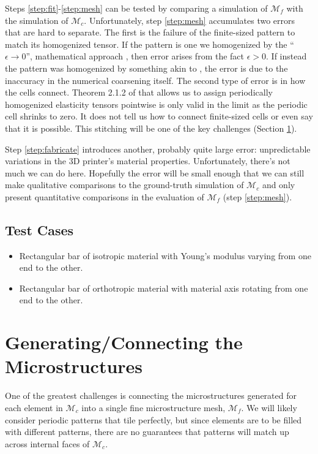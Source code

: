 \documentclass[10pt]{article}
\providecommand{\mesh}{\mathcal{M}}
\begin{document}
Steps \ref{step:fit}-\ref{step:mesh} can be tested by comparing a simulation of
$\mesh_f$ with the simulation of $\mesh_c$. Unfortunately, step \ref{step:mesh}
accumulates two errors that are hard to separate. The first is the failure of
the finite-sized pattern to match its homogenized tensor. If the pattern is one
we homogenized by the ``$\epsilon \to 0$'', mathematical approach
\cite{allaire2002shape}, then error arises from the fact $\epsilon > 0$. If
instead the pattern was homogenized by something akin to \cite{Kharevych2009},
the error is due to the inaccuracy in the numerical coarsening itself. The
second type of error is in how the cells connect. Theorem 2.1.2 of
\cite{allaire2002shape} that allows us to assign periodically homogenized
elasticity tensors pointwise is only valid in the limit as the periodic cell
shrinks to zero. It does not tell us how to connect finite-sized cells or even
say that it is possible. This stitching will be one of the key challenges
(Section \ref{sec:gen_connect}).

Step \ref{step:fabricate} introduces another, probably quite large error: unpredictable
variations in the 3D printer's material properties. Unfortunately, there's not
much we can do here. Hopefully the error will be small enough that we can still
make qualitative comparisons to the ground-truth simulation of $\mesh_c$ and
only present quantitative comparisons in the evaluation of $\mesh_f$ (step
\ref{step:mesh}).

\subsection{Test Cases}
\begin{itemize}
    \item Rectangular bar of isotropic material with Young's modulus varying from one end
        to the other.
    \item Rectangular bar of orthotropic material with material axis rotating
        from one end to the other.
\end{itemize}

\section{Generating/Connecting the Microstructures}
\label{sec:gen_connect}
One of the greatest challenges is connecting the microstructures generated for
each element in $\mesh_c$ into a single fine microstructure mesh, $\mesh_f$. We
will likely consider periodic patterns that tile perfectly, but since elements
are to be filled with different patterns, there are no guarantees that patterns
will match up across internal faces of $\mesh_c$.
\end{document}
